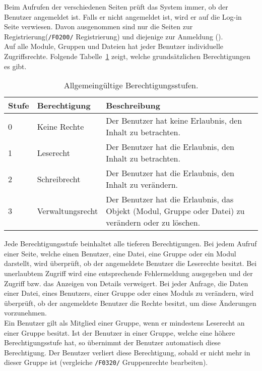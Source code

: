 

Beim Aufrufen der verschiedenen Seiten prüft das System immer,
ob der Benutzer angemeldet ist. Falls er nicht angemeldet ist,
wird er auf die Log-in Seite verwiesen. Davon ausgenommen sind
nur die Seiten zur Registrierung(\texttt{/F0200/} Registrierung) und diejenige zur Anmeldung (). \\

Auf alle Module, Gruppen und Dateien hat jeder Benutzer individuelle Zugriffsrechte. Folgende Tabelle~\ref{tab:rights} zeigt, welche grundsätzlichen Berechtigungen es gibt.

\begin{table}[H]
\begin{tabularx}{\textwidth}{|l|l|X|} \hline
\textbf{Stufe} & \textbf{Berechtigung}     & \textbf{Beschreibung} \\ \hline
0     & Keine Rechte     & Der Benutzer hat keine Erlaubnis, den Inhalt zu betrachten.\\ \hline
1     & Leserecht        & Der Benutzer hat die Erlaubnis, den Inhalt zu betrachten.\\ \hline
2     & Schreibrecht     & Der Benutzer hat die Erlaubnis, den Inhalt zu verändern.\\ \hline
3     & Verwaltungsrecht & Der Benutzer hat die Erlaubnis, das Objekt (Modul, Gruppe oder Datei) zu verändern oder zu löschen.\\ \hline
\end{tabularx}
\caption{Allgemeingültige Berechtigungsstufen.}
\label{tab:rights}
\end{table}

Jede Berechtigungsstufe beinhaltet alle tieferen Berechtigungen. Bei jedem Aufruf einer Seite, welche einen Benutzer, eine Datei, eine Gruppe oder ein Modul darstellt, wird überprüft, ob der angemeldete Benutzer die Leserechte besitzt. Bei unerlaubtem Zugriff wird eine entsprechende Fehlermeldung ausgegeben und der Zugriff bzw. das Anzeigen von Details verweigert. Bei jeder Anfrage, die Daten einer Datei, eines Benutzers, einer Gruppe oder eines Moduls zu verändern, wird überprüft, ob der angemeldete Benutzer die Rechte besitzt, um diese Änderungen vorzunehmen.\\

Ein Benutzer gilt als Mitglied einer Gruppe, wenn er mindestens Leserecht an einer Gruppe besitzt. Ist der Benutzer in einer Gruppe, welche eine höhere Berechtigungsstufe hat, so übernimmt der Benutzer automatisch diese Berechtigung. Der Benutzer verliert diese Berechtigung, sobald er nicht mehr in dieser Gruppe ist (vergleiche \texttt{/F0320/} Gruppenrechte bearbeiten).\\

